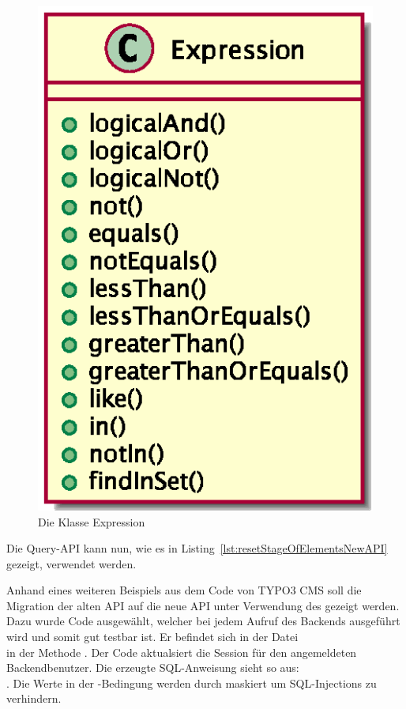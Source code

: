 \begin{figure}[H]
    \centering
    \includegraphics[scale=0.5]{gfx/uml/NewAPI/Expression.eps}
    \caption{Die Klasse Expression}
    \label{fig:expressionClass}
\end{figure}

Die Query-API kann nun, wie es in Listing~\ref{lst:resetStageOfElementsNewAPI} gezeigt, verwendet werden.

Anhand eines weiteren Beispiels aus dem Code von TYPO3 CMS soll die Migration der alten API auf die neue API unter Verwendung des  gezeigt werden. Dazu wurde Code ausgewählt, welcher bei jedem Aufruf des Backends ausgeführt wird und somit gut testbar ist. Er befindet sich in der Datei\\  in der Methode . Der Code aktualsiert die Session für den angemeldeten Backendbenutzer. Die erzeugte SQL-Anweisung sieht so aus:\\ . Die Werte in der -Bedingung werden durch  maskiert um SQL-Injections zu verhindern.

